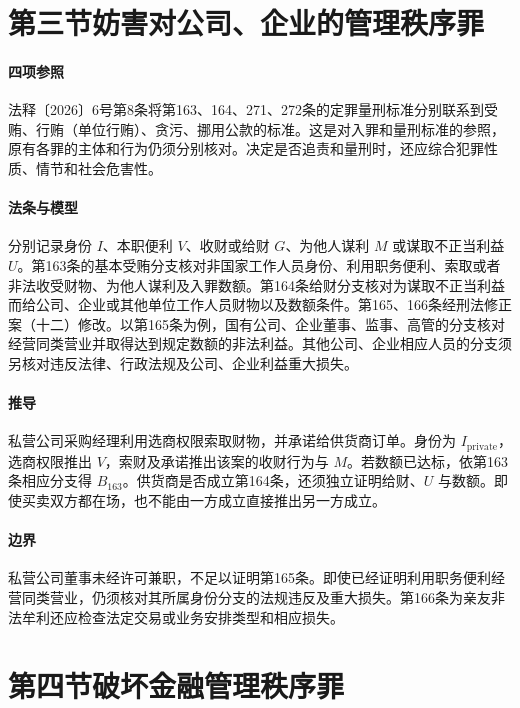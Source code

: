 \section{第三节\quad 妨害对公司、企业的管理秩序罪}

\paragraph{四项参照}
法释〔2026〕6号第8条将第163、164、271、272条的定罪量刑标准分别联系到受贿、行贿（单位行贿）、贪污、挪用公款的标准。这是对入罪和量刑标准的参照，原有各罪的主体和行为仍须分别核对。决定是否追责和量刑时，还应综合犯罪性质、情节和社会危害性。

\paragraph{法条与模型}
分别记录身份 \(I\)、本职便利 \(V\)、收财或给财 \(G\)、为他人谋利 \(M\) 或谋取不正当利益 \(U\)。第163条的基本受贿分支核对非国家工作人员身份、利用职务便利、索取或者非法收受财物、为他人谋利及入罪数额。第164条给财分支核对为谋取不正当利益而给公司、企业或其他单位工作人员财物以及数额条件。第165、166条经刑法修正案（十二）修改。以第165条为例，国有公司、企业董事、监事、高管的分支核对经营同类营业并取得达到规定数额的非法利益。其他公司、企业相应人员的分支须另核对违反法律、行政法规及公司、企业利益重大损失。

\paragraph{推导}
私营公司采购经理利用选商权限索取财物，并承诺给供货商订单。身份为 \(I_{\mathrm{private}}\)，选商权限推出 \(V\)，索财及承诺推出该案的收财行为与 \(M\)。若数额已达标，依第163条相应分支得 \(B_{163}\)。供货商是否成立第164条，还须独立证明给财、\(U\) 与数额。即使买卖双方都在场，也不能由一方成立直接推出另一方成立。

\paragraph{边界}
私营公司董事未经许可兼职，不足以证明第165条。即使已经证明利用职务便利经营同类营业，仍须核对其所属身份分支的法规违反及重大损失。第166条为亲友非法牟利还应检查法定交易或业务安排类型和相应损失。

\section{第四节\quad 破坏金融管理秩序罪}

